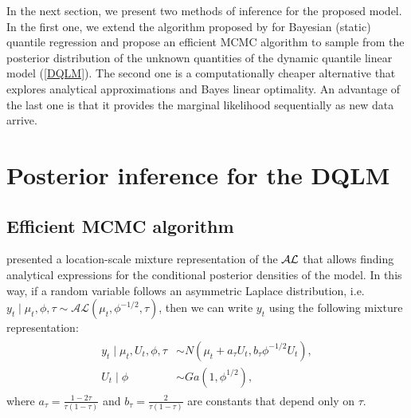 \documentclass[12pt,a4paper]{article}\usepackage[]{graphicx}\usepackage[]{color}\usepackage{subfigure}
\begin{document}
In the next section, we present two methods of inference for the proposed model. In the first one, we extend the algorithm proposed by \cite{kozumi2011gibbs} for Bayesian (static) quantile regression and propose an efficient MCMC algorithm to sample from the posterior distribution of the unknown quantities of the dynamic quantile linear model (\ref{DQLM}). 
The second one is a computationally cheaper alternative that explores analytical approximations and Bayes linear optimality. An advantage of the last one is that it provides the marginal likelihood sequentially as new data arrive. 



\section{Posterior inference for the DQLM}

\subsection{Efficient MCMC algorithm}

\cite{kotz2001laplace} presented a location-scale mixture representation of the $\cal{AL}$ that allows finding analytical expressions for the conditional posterior densities of the model. 
In this way, if a random variable follows an asymmetric Laplace distribution, i.e. $y_t \mid \mu_t, \phi, \tau \sim \mathcal{AL}\left( \mu_t, \phi^{-1/2}, \tau \right)$, then we can write $y_t$ using the following mixture representation:
\begin{align}\label{mix_repr}
\begin{array}{rl}
y_t\mid \mu_t,U_t,\phi,\tau &\sim N(\mu_t + a_\tau U_t,b_\tau \phi^{-1/2} U_t),\\
U_t\mid \phi &\sim Ga(1,\phi^{1/2}),
\end{array}
\end{align}
where $a_{\tau}=\frac{1-2\tau}{\tau(1-\tau)}$ and $b_{\tau} =\frac{2}{\tau(1-\tau)}$ are constants that depend only on $\tau$. 
\end{document}
